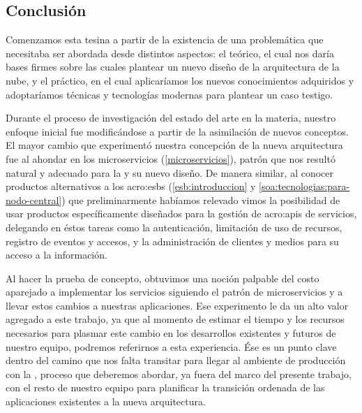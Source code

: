 \subsection{Conclusión}
\label{conclusion}

Comenzamos esta tesina a partir de la existencia de una problemática que necesitaba ser abordada desde distintos aspectos: el teórico, el cual nos daría bases firmes sobre las cuales plantear un nuevo diseño de la arquitectura de la nube, y el práctico, en el cual aplicaríamos los nuevos conocimientos adquiridos y adoptaríamos técnicas y tecnologías modernas para plantear un caso testigo.

Durante el proceso de investigación del estado del arte en la materia, nuestro enfoque inicial fue modificándose a partir de la asimilación de nuevos conceptos. El mayor cambio que experimentó nuestra concepción de la nueva arquitectura fue al ahondar en los microservicios (\autoref{microservicios}), patrón que nos resultó natural y adecuado para la {\cloud} y su nuevo diseño. De manera similar, al conocer productos alternativos a los \glspl{acro:esb} (\autoref{esb:introduccion} y \autoref{soa:tecnologias:para-nodo-central}) que preliminarmente habíamos relevado vimos la posibilidad de usar productos específicamente diseñados para la gestión de \glspl{acro:api} de servicios, delegando en éstos tareas como la autenticación, limitación de uso de recursos, registro de eventos y accesos, y la administración de clientes y medios para su acceso a la información.

Al hacer la prueba de concepto, obtuvimos una noción palpable del costo aparejado a implementar los servicios siguiendo el patrón de microservicios y a llevar estos cambios a nuestras aplicaciones. Ese experimento le da un alto valor agregado a este trabajo, ya que al momento de estimar el tiempo y los recursos necesarios para plasmar este cambio en los desarrollos existentes y futuros de nuestro equipo, podremos referirnos a esta experiencia. Ése es un punto clave dentro del camino que nos falta transitar para llegar al ambiente de producción con la {\cloud}, proceso que deberemos abordar, ya fuera del marco del presente trabajo, con el resto de nuestro equipo para planificar la transición ordenada de las aplicaciones existentes a la nueva arquitectura.

